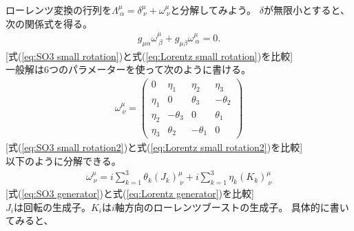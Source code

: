 \documentclass[10pt,a4paper]{jarticle}
\begin{document}
ローレンツ変換の行列を$\Lambda^\mu_{~\alpha} = \delta^\mu_{~\nu} + \omega^\mu_{~\nu}$と分解してみよう。
$\delta$が無限小とすると、次の関係式を得る。
\begin{align}
g_{\mu\alpha} \omega^\mu_{~\beta} + g_{\mu\beta} \omega^\mu_{~\alpha} = 0. \label{eq:Lorentz small rotation}
\end{align}
[式(\ref{eq:SO3 small rotation})と式(\ref{eq:Lorentz small rotation})を比較]\\
%
一般解は6つのパラメーターを使って次のように書ける。
\begin{align}
\omega^\mu_{~\nu}
=
\left(\begin{array}{cccc}
0 & \eta_1 & \eta_2 & \eta_3 \\
\eta_1 & 0 & \theta_3 & -\theta_2 \\
\eta_2 & -\theta_3 & 0 & \theta_1 \\
\eta_3 & \theta_2 & -\theta_1 & 0
\end{array}\right) \label{eq:Lorentz small rotation2}
\end{align}
[式(\ref{eq:SO3 small rotation2})と式(\ref{eq:Lorentz small rotation2})を比較]\\
%
以下のように分解できる。
\begin{align}
\omega^\mu_{~\nu} = i \sum_{k=1}^3 \theta_k (J_k)^\mu_{~\nu} + i \sum_{k=1}^3 \eta_k (K_k)^\mu_{~\nu} \label{eq:Lorentz generator}
\end{align}
[式(\ref{eq:SO3 generator})と式(\ref{eq:Lorentz generator})を比較]\\
%
$J_i$は回転の生成子。$K_i$は$i$軸方向のローレンツブーストの生成子。
具体的に書いてみると、
\end{document}
